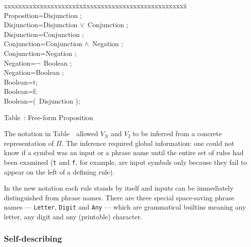 \begin{enumerate}
{}
\setcounter{PropositionsAgain}{\value{table}}
\begin{samepage}
\begin{tt}
\begin{tabbing}
xxxxxxxx\=xxxxxxxxxxxx\=xx\=xxxxxxxxxxxxxxxxxxxxxxxxxxxxx\=\kill
\>Proposition\>=\>Disjunction ;                                \\
\>Disjunction\>=\>Disjunction \sq$\vee$\sq\ Conjunction ;      \\
\>Disjunction\>=\>Conjunction ;                                \\
\>Conjunction\>=\>Conjunction \sq$\wedge$\sq\ Negation ;       \\
\>Conjunction\>=\>Negation ;                                   \\
\>Negation\>=\>\sq$\neg$\sq\ Boolean ;		                   \\
\>Negation\>=\>Boolean ;		                               \\
\>Boolean\>=\>\sq t\sq ;                                       \\
\>Boolean\>=\>\sq f\sq ;                                       \\
\>Boolean\>=\>\sq(\sq\  Disjunction \sq)\sq  ;
\end{tabbing}
\end{tt}
\begin{center}
Table~\thetable: Free-form Proposition \cfg\
\end{center}
\end{samepage}

The notation in Table~\thePropositionGrammar\ allowed $V_N$ and
$V_I$ to be inferred from a concrete representation of $\Pi$.  
The inference required global information: 
one could not know if a symbol was an input or a phrase name 
until the entire set of rules had been examined 
({\tt t} and {\tt f}, for example, 
are input symbols only because they 
fail to appear on the left of a defining rule).

In the new notation each rule stands by itself and inputs 
can be immediately distinguished from phrase names.  
There are three special space-saving phrase names --- 
{\tt Letter}, {\tt Digit} and {\tt Any} --- which are grammatical 
builtins meaning any letter, any digit and any (printable) character.  

\subsubsection{Self-describing \cfg}


\end{enumerate}
